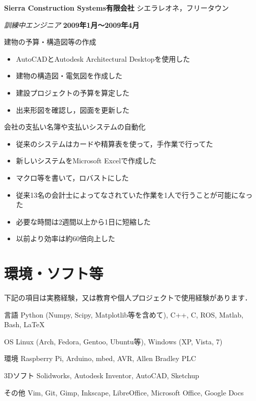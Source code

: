 \documentclass[10pt, a4paper]{article}
\def\xeCJKembold{0.15}
\def\saveCJKnode{\dimen255\lastkern}
\def\restoreCJKnode{\kern-\dimen255\kern\dimen255}
\let\CJKoldsymbol\CJKsymbol
\let\CJKoldpunctsymbol\CJKpunctsymbol
\def\CJKfakeboldsymbol#1{%
\special{pdf:literal direct 2 Tr \xeCJKembold\space w}%
\CJKoldsymbol{#1}%
\saveCJKnode
\special{pdf:literal direct 0 Tr}%
\restoreCJKnode}
\def\CJKfakeboldpunctsymbol#1{%
\special{pdf:literal direct 2 Tr \xeCJKembold\space w}%
\CJKoldpunctsymbol{#1}%
\saveCJKnode
\special{pdf:literal direct 0 Tr}%
\restoreCJKnode}
\newcommand\CJKfakebold[1]{%
\let\CJKsymbol\CJKfakeboldsymbol
\let\CJKpunctsymbol\CJKfakeboldpunctsymbol
#1%
\let\CJKsymbol\CJKoldsymbol
\let\CJKpunctsymbol\CJKoldpunctsymbol}
\begin{document}
\halfblankline

\CJKfakebold{\textbf{Sierra Construction Systems有限会社}}\hfill シエラレオネ，フリータウン

\begin{outerlist}
\item[] \textit{訓練中エンジニア} \hfill \textbf{2009年1月〜2009年4月}
  \begin{innerlist}
  \item 建物の予算・構造図等の作成
    \begin{itemize}
      \item AutoCADとAutodesk Architectural Desktopを使用した
      \item 建物の構造図・電気図を作成した
      \item 建設プロジェクトの予算を算定した
      \item 出来形図を確認し，図面を更新した
    \end{itemize}
  \item 会社の支払い名簿や支払いシステムの自動化
    \begin{itemize}
      \item 従来のシステムはカードや精算表を使って，手作業で行ってた
      \item 新しいシステムをMicrosoft Excelで作成した
      \item マクロ等を書いて，ロバストにした
      \item 従来13名の会計士によってなされていた作業を1人で行うことが可能になった
      \item 必要な時間は2週間以上から1日に短縮した
      \item 以前より効率は約60倍向上した
    \end{itemize}
  \end{innerlist}
\end{outerlist}

\section{環境・ソフト等}
下記の項目は実務経験，又は教育や個人プロジェクトで使用経験があります．
\begin{outerlist}
\item[言語] Python (Numpy, Scipy, Matplotlib等を含めて), C++, C, ROS, Matlab, Bash, \LaTeX
\item[OS] Linux (Arch, Fedora, Gentoo, Ubuntu等), Windows (XP, Vista, 7)
\item[環境] Raspberry Pi, Arduino, mbed, AVR, Allen Bradley PLC
\item[3Dソフト] Solidworks, Autodesk Inventor, AutoCAD, Sketchup
\item[その他] Vim, Git, Gimp, Inkscape, LibreOffice, Microsoft Office, Google Docs
\end{outerlist}
\end{document}
